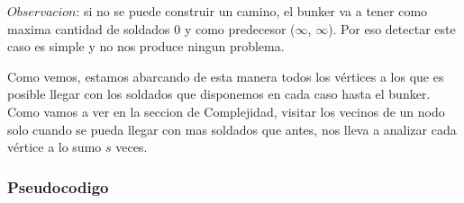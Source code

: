 $Observacion$: si no se puede construir un camino, el bunker va a tener como maxima cantidad de soldados 0 y como predecesor ($\infty$, $\infty$). Por eso detectar este caso es simple y no nos produce ningun problema.

\medskip

Como vemos, estamos abarcando de esta manera todos los vértices a los que es posible llegar con los soldados que disponemos en cada caso hasta el bunker. Como vamos a ver en la seccion de Complejidad, visitar los vecinos de un nodo solo cuando se pueda llegar con mas soldados que antes, nos lleva a analizar cada vértice a lo sumo $s$ veces.

\pagebreak

\subsubsection{Pseudocodigo}

